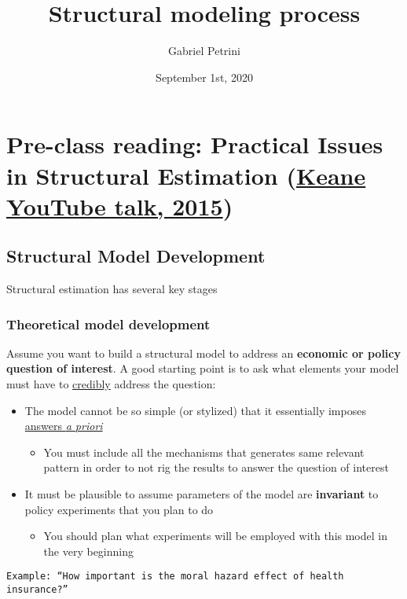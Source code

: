 \documentclass[11pt]{article}
\author{Gabriel Petrini}
\date{September 1st, 2020}
\title{Structural modeling process}
\begin{document}
\maketitle
\tableofcontents


\section{Pre-class reading: Practical Issues in Structural Estimation (\href{https://www.youtube.com/watch?v=0hazaPBAYWE}{Keane YouTube talk, 2015})}
\label{sec:org7aa7cf1}

\subsection{Structural Model Development}
\label{sec:org2a0fe8e}

Structural estimation has several key stages

\subsubsection{Theoretical model development}
\label{sec:orgf34758d}

Assume you want to build a structural model to address an \textbf{economic or policy question of interest}. A good starting point is to ask what elements your model must have to \uline{credibly} address the question:

\begin{itemize}
\item The model cannot be so simple (or stylized) that it essentially imposes \uline{answers \emph{a priori}}
\begin{itemize}
\item You must include all the mechanisms that generates same relevant pattern in order to not rig the results to answer the question of interest
\end{itemize}
\item It must be plausible to assume parameters of the model are \textbf{invariant} to policy experiments that you plan to do
\begin{itemize}
\item You should plan what experiments will be employed with this model in the very beginning
\end{itemize}
\end{itemize}

\texttt{Example: ``How important is the moral hazard effect of health insurance?''}
\end{document}
